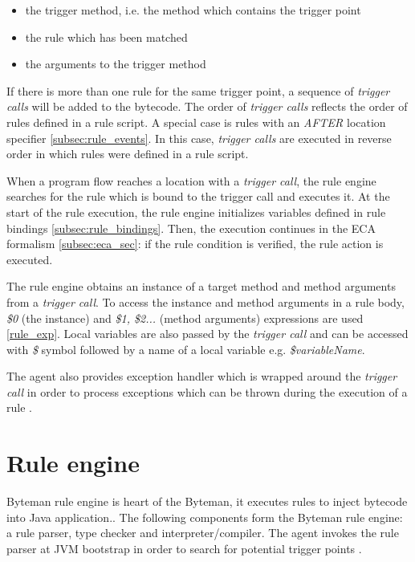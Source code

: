 \documentclass[12pt,oneside]{fithesis2}
\begin{document}
\begin{itemize}
	\item	the trigger method, i.e. the method which contains the trigger point
	\item	the rule which has been matched
	\item	the arguments to the trigger method
\end{itemize}

If there is more than one rule for the same trigger point, a sequence of \textit{trigger calls} will be added to the bytecode. The order of \textit{trigger calls} reflects the order of rules defined in a rule script. A special case is rules with an \textit{AFTER} location specifier \ref{subsec:rule_events}. In this case, \textit{trigger calls} are executed in reverse order in which rules were defined in a rule script.

When a program flow reaches a location with a \textit{trigger call}, the rule engine searches for the rule which is bound to the trigger call and executes it. At the start of the rule execution, the rule engine initializes variables defined in rule bindings \ref{subsec:rule_bindings}. Then, the execution continues in the ECA formalism \ref{subsec:eca_sec}: if the rule condition is verified, the rule action is executed.

The rule engine obtains an instance of a target method and method arguments from a \textit{trigger call}. To access the instance and method arguments in a rule body, \textit{\$0} (the instance) and \textit{\$1, \$2...} (method arguments) expressions are used \ref{rule_exp}. Local variables are also passed by the \textit{trigger call} and can be accessed with \textit{\$} symbol followed by a name of a local variable e.g. \textit{\$variableName}.

The agent also provides exception handler which is wrapped around the \textit{trigger call} in order to process exceptions which can be thrown during the execution of a rule \cite[Agent Transformation]{byteman_doc}.

\section{Rule engine}
\label{sec:rule_engine}
Byteman rule engine is heart of the Byteman, it executes rules to inject bytecode into Java application.. The following components form the Byteman rule engine: a rule parser, type checker and interpreter/compiler. The agent invokes the rule parser at JVM bootstrap in order to search for potential trigger points \cite[ECA Rule Engine]{byteman_doc}.
\end{document}
